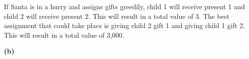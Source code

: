 \documentclass[11pt]{article}
\renewcommand\part[1]{\vspace{.10in}\textbf{(#1)}}
\begin{document}
If Santa is in a hurry and assigns gifts greedily, child 1 will receive present 1 and child 2 will receive present 2. This will result in a total value of 3. The best assignment that could take place is giving child 2 gift 1 and giving child 1 gift 2. This will result in a total value of 3,000. 

\part{b}
\end{document}
